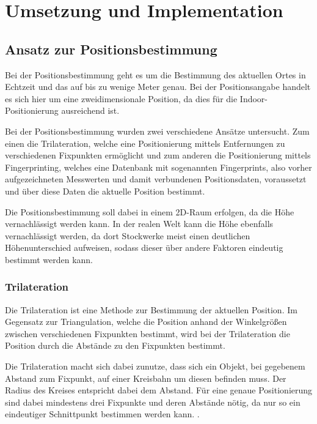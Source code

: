 \chapter{Umsetzung und Implementation}
\label{chap:implementation}

\section{Ansatz zur Positionsbestimmung}
\label{sec:implementation:positioning}
Bei der Positionsbestimmung geht es um die Bestimmung des aktuellen Ortes in Echtzeit und das auf bis zu wenige Meter genau. Bei der Positionsangabe handelt es sich hier um eine zweidimensionale Position, da dies für die Indoor-Positionierung ausreichend ist.

Bei der Positionsbestimmung wurden zwei verschiedene Ansätze untersucht. Zum einen die Trilateration, welche eine Positionierung mittels Entfernungen zu verschiedenen Fixpunkten ermöglicht und zum anderen die Positionierung mittels Fingerprinting, welches eine Datenbank mit sogenannten Fingerprints, also vorher aufgezeichneten Messwerten und damit verbundenen Positionsdaten, voraussetzt und über diese Daten die aktuelle Position bestimmt.

Die Positionsbestimmung soll dabei in einem 2D-Raum erfolgen, da die Höhe vernachlässigt werden kann. In der realen Welt kann die Höhe ebenfalls vernachlässigt werden, da dort Stockwerke meist einen deutlichen Höhenunterschied aufweisen, sodass dieser über andere Faktoren eindeutig bestimmt werden kann.

\subsection{Trilateration}
\label{sec:implementation:trilateration}
Die Trilateration ist eine Methode zur Bestimmung der aktuellen Position. Im Gegensatz zur Triangulation, welche die Position anhand der Winkelgrößen zwischen verschiedenen Fixpunkten bestimmt, wird bei der Trilateration die Position durch die Abstände zu den Fixpunkten bestimmt. 

Die Trilateration macht sich dabei zunutze, dass sich ein Objekt, bei gegebenem Abstand zum Fixpunkt, auf einer Kreisbahn um diesen befinden muss. Der Radius des Kreises entspricht dabei dem Abstand. Für eine genaue Positionierung sind dabei mindestens drei Fixpunkte und deren Abstände nötig, da nur so ein eindeutiger Schnittpunkt bestimmen werden kann. \cite{wlanposlateration}.

